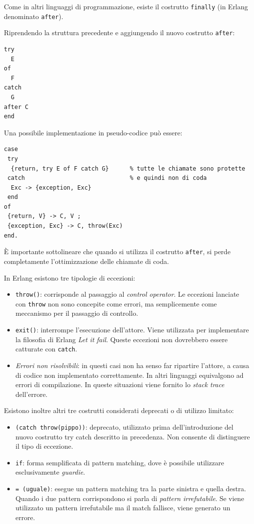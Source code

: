 \documentclass{article}
\begin{document}
Come in altri linguaggi di programmazione, esiste il costrutto \texttt{finally} (in Erlang denominato \texttt{after}).

Riprendendo la struttura precedente e aggiungendo il nuovo costrutto \texttt{after}:
\begin{tcolorbox}
\begin{verbatim}
try
  E
of
  F
catch
  G
after C
end
\end{verbatim}
\end{tcolorbox}
\vspace{8pt}
Una possibile implementazione in pseudo-codice può essere:
\begin{tcolorbox}
\begin{verbatim}
case
 try
  {return, try E of F catch G}      % tutte le chiamate sono protette
 catch                              % e quindi non di coda
  Exc -> {exception, Exc}
 end
of
 {return, V} -> C, V ;
 {exception, Exc} -> C, throw(Exc)
end.
\end{verbatim}
\end{tcolorbox}
\vspace{8pt}
È importante sottolineare che quando si utilizza il costrutto \texttt{after}, si perde completamente l'ottimizzazione delle chiamate di coda.

\pagebreak

In Erlang esistono tre tipologie di eccezioni:
\begin{itemize}
    \item \texttt{throw()}: corrisponde al passaggio al \textit{control operator}. Le eccezioni lanciate con \texttt{throw} non sono concepite come errori, ma semplicemente come meccanismo per il passaggio di controllo.
    \item \texttt{exit()}: interrompe l'esecuzione dell'attore. Viene utilizzata per implementare la filosofia di Erlang \textit{Let it fail}. Queste eccezioni non dovrebbero essere catturate con \texttt{catch}.
    \item \textit{Errori non risolvibili}: in questi casi non ha senso far ripartire l'attore, a causa di codice non implementato correttamente. In altri linguaggi equivalgono ad errori di compilazione. In queste situazioni viene fornito lo \textit{stack trace} dell'errore.
\end{itemize}
\vspace{8pt}
Esistono inoltre altri tre costrutti considerati deprecati o di utilizzo limitato:
\begin{itemize}
    \item \texttt{(catch throw(pippo))}: deprecato, utilizzato prima dell'introduzione del nuovo costrutto try catch descritto in precedenza. Non consente di distinguere il tipo di eccezione.
    \item \texttt{if}: forma semplificata di pattern matching, dove è possibile utilizzare esclusivamente \textit{guardie}.
    \item \texttt{= (uguale)}: esegue un pattern matching tra la parte sinistra e quella destra. Quando i due pattern corrispondono si parla di \textit{pattern irrefutabile}. Se viene utilizzato un pattern irrefutabile ma il match fallisce, viene generato un errore.
\end{itemize}
\end{document}
